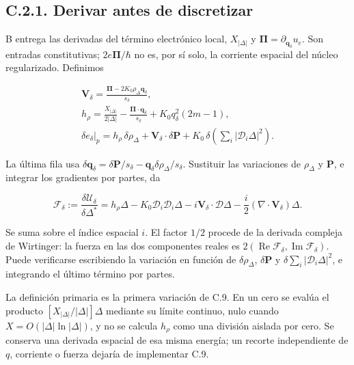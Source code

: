 \documentclass[
  spanish,
  10pt,
  a4paper,
]{article}
\begin{document}
\subsection{C.2.1. Derivar antes de
discretizar}\label{c.2.1.-derivar-antes-de-discretizar}

B entrega las derivadas del término electrónico local, \(X_{|\Delta|}\)
y \(\boldsymbol\Pi=\partial_{\mathbf q_\delta}u_e\). Son entradas
constitutivas; \(2e\boldsymbol\Pi/\hbar\) no es, por sí solo, la
corriente espacial del núcleo regularizado. Definimos

\[
\begin{gathered}
\mathbf V_\delta=\frac{\boldsymbol\Pi-2K_0\rho_\Delta\mathbf q_\delta}{s_\delta},\\
h_\rho=\frac{X_{|\Delta|}}{2|\Delta|}
-\frac{\boldsymbol\Pi\cdot\mathbf q_\delta}{s_\delta}
+K_0q_\delta^2(2m-1),\\
\left.\delta e_\delta\right|_p
=h_\rho\,\delta\rho_\Delta+\mathbf V_\delta\cdot\delta\mathbf P
+K_0\,\delta\!\left(\sum_i|\mathcal D_i\Delta|^2\right).
\end{gathered}\tag{C.11}
\]

La última fila usa
\(\delta\mathbf q_\delta=\delta\mathbf P/s_\delta-\mathbf q_\delta\delta\rho_\Delta/s_\delta\).
Sustituir las variaciones de \(\rho_\Delta\) y \(\mathbf P\), e integrar
los gradientes por partes, da

\[
\mathscr F_\delta:=\frac{\delta\mathcal U_\delta}{\delta\Delta^*}
=h_\rho\Delta-K_0\mathcal D_i\mathcal D_i\Delta
-i\mathbf V_\delta\cdot\boldsymbol{\mathcal D}\Delta
-\frac{i}{2}(\nabla\cdot\mathbf V_\delta)\Delta.
\tag{C.12}
\]

Se suma sobre el índice espacial \(i\). El factor \(1/2\) procede de la
derivada compleja de Wirtinger: la fuerza en las dos componentes reales
es
\(2(\operatorname{Re}\mathscr F_\delta,\operatorname{Im}\mathscr F_\delta)\).
Puede verificarse escribiendo la variación en función de
\(\delta\rho_\Delta\), \(\delta\mathbf P\) y
\(\delta\sum_i|\mathcal D_i\Delta|^2\), e integrando el último término
por partes.

La definición primaria es la primera variación de C.9. En un cero se
evalúa el producto \([X_{|\Delta|}/|\Delta|]\Delta\) mediante su límite
continuo, nulo cuando \(X=O(|\Delta|\ln|\Delta|)\), y no se calcula
\(h_\rho\) como una división aislada por cero. Se conserva una derivada
espacial de esa misma energía; un recorte independiente de \(q\),
corriente o fuerza dejaría de implementar C.9.
\end{document}
